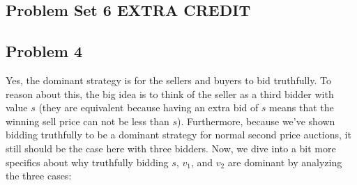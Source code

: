 \documentclass[12 pt]{article}
\begin{document}
	\begin{center}
		\section*{Problem Set 6 EXTRA CREDIT}
	\end{center}
	
	\subsection*{Problem 4}
	
	\noindent Yes, the dominant strategy is for the sellers and buyers to bid truthfully. To reason about this, the big idea is to think of the seller as a third bidder with value $s$ (they are equivalent because having an extra bid of $s$ means that the winning sell price can not be less than $s$). Furthermore, because we've shown bidding truthfully to be a dominant strategy for normal second price auctions, it still should be the case here with three bidders. Now, we dive into a bit more specifics about why truthfully bidding $s$, $v_1$, and $v_2$ are dominant by analyzing the three cases:
	
\end{document}
